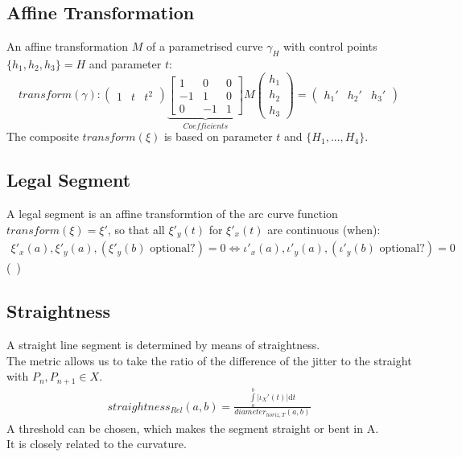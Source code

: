 \documentclass{report}
\begin{document}
\subsection{Affine Transformation}
An affine transformation $M$ of a parametrised curve $\gamma_{H}$ with control points $\{h_{1},h_{2},h_{3}\} = H$ and parameter $t$:
\begin{equation}
transform(\gamma):
\begin{pmatrix}
1 & t & t^2
\end{pmatrix}
\underbrace{\begin{bmatrix}
1 & 0 & 0\\
-1 & 1 & 0\\
0 & -1 &1
\end{bmatrix}}_{Coefficients}
M
\begin{pmatrix}
h_{1} \\
h_{2} \\
h_{3}
\end{pmatrix}
=
\begin{pmatrix}
h_{1}' & h_{2}' & h_{3}'
\end{pmatrix}
\end{equation}
The composite $transform(\xi)$ is based on parameter $t$ and $\{H_{1}, ... ,H_{4}\}$. ~\cite[Spline\_Axioms.tex]{Stopeight}

\subsection{Legal Segment}
A legal segment is an affine transformtion of the arc curve function $transform(\xi) = \xi'$, so that all $\xi'_{y}(t)$ for $\xi'_{x}(t)$ are continuous (when):
\begin{align}
\xi'_{x}(a),\xi'_{y}(a), (\xi'_{y}(b)\text{ optional?}) = 0 \Leftrightarrow \iota'_{x}(a),\iota'_{y}(a), (\iota'_{y}(b)\text{ optional?}) = 0
\end{align}
(~\cite[Riemann Integrable?]{Widon})

\subsection{Straightness}
A straight line segment is determined by means of straightness.\\
The metric allows us to take the ratio of the difference of the jitter to the straight with $P_{n},P_{n+1} \in X$. \\
\begin{align}
straightness_{Rel}(a,b)=\frac{\int \limits _{a}^{b} \lvert \iota_{X}'(t) \rvert \mathrm{d}t}{diameter_{horiz,T}(a,b)}
\end{align}
A threshold can be chosen, which makes the segment straight or bent in A.\\
It is closely related to the curvature.
\end{document}
